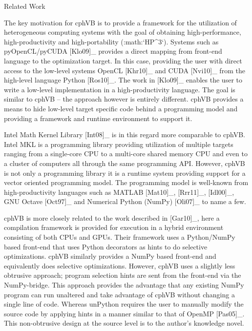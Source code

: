 
Related Work
~~~~~~~~~~~~

The key motivation for cphVB is to provide a framework for the utilization of heterogeneous computing systems with the goal of obtaining high-performance, high-productivity and high-portability (:math:`HP^3`). Systems such as pyOpenCL/pyCUDA [Klo09]_ provides a direct mapping from front-end language to the optimization target. In this case, providing the user with direct access to the low-level systems OpenCL [Khr10]_ and CUDA [Nvi10]_ from the high-level language Python [Ros10]_.
The work in [Klo09]_ enables the user to write a low-level implementation in a high-productivity language. The goal is similar to cphVB – the approach however is entirely different. cphVB provides a means to hide low-level target specific code behind a programming model and providing a framework and runtime environment to support it.

Intel Math Kernel Library [Int08]_ is in this regard more comparable to cphVB. Intel MKL is a programming library providing utilization of multiple targets ranging from a single-core CPU to a multi-core shared memory CPU and even to a cluster of computers all through the same programming API. However, cphVB is not only a programming library it is a runtime system providing support for a vector oriented programming model. The programming model is well-known from high-productivity languages such as MATLAB [Mat10]_, [Rrr11]_, [Idl00]_, GNU Octave [Oct97]_ and Numerical Python (NumPy) [Oli07]_ to name a few.

cphVB is more closely related to the work described in [Gar10]_, here a compilation framework is provided for execution in a hybrid environment consisting of both CPUs and GPUs. Their framework uses a Python/NumPy based front-end that uses Python decorators as hints to do selective optimizations. cphVB similarly provides a NumPy based front-end and equivalently does selective optimizations.
However, cphVB uses a slightly less obtrusive approach; program selection hints are sent from the front-end via the NumPy-bridge. This approach provides the advantage that any existing NumPy program can run unaltered and take advantage of cphVB without changing a single line of code. Whereas unPython requires the user to manually modify the source code by applying hints in a manner similar to that of OpenMP [Pas05]_. This non-obtrusive design at the source level is to the author's knowledge novel.

